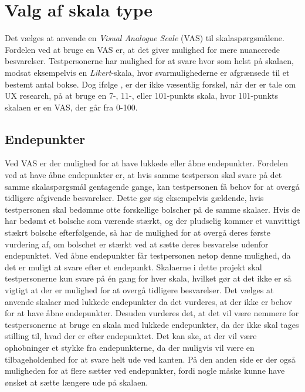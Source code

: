\section{Valg af skala type}
\label{ParametreSkalaType}
%
Det vælges at anvende en \textit{Visual Analogue Scale} (VAS) til skalaspørgsmålene. Fordelen ved at bruge en VAS er, at det giver mulighed for mere nuancerede besvarelser. Testpersonerne har mulighed for at svare hvor som helst på skalaen, modsat eksempelvis en \textit{Likert}-skala, hvor svarmulighederne er afgrænsede til et bestemt antal bokse.
Dog ifølge \textcite[s. 73]{PDF:RatingScales}, er der ikke væsentlig forskel, når der er tale om UX research, på at bruge en 7-, 11-, eller 101-punkts skala, hvor 101-punkts skalaen er en VAS, der går fra 0-100.
%
\subsection{Endepunkter}
Ved VAS er der mulighed for at have lukkede eller åbne endepunkter. Fordelen ved at have åbne endepunkter er, at hvis samme testperson skal svare på det samme skalaspørgsmål gentagende gange, kan testpersonen få behov for at overgå tidligere afgivende besvarelser. Dette gør sig eksempelvis gældende, hvis testpersonen skal bedømme otte forskellige bolscher på de samme skalaer. Hvis de har bedømt et bolsche som værende stærkt, og der pludselig kommer et vanvittigt stækrt bolsche efterfølgende, så har de mulighed for at overgå deres første vurdering af, om bolschet er stærkt ved at sætte deres besvarelse udenfor endepunktet. Ved åbne endepunkter får testpersonen netop denne mulighed, da det er muligt at svare efter et endepunkt. Skalaerne i dette projekt skal testpersonerne kun svare på én gang for hver skala, hvilket gør at det ikke er så vigtigt at der er mulighed for at overgå tidligere besvarelser. \blankline
%
Det vælges at anvende skalaer med lukkede endepunkter da det vurderes, at der ikke er behov for at have åbne endepunkter. Desuden vurderes det, at det vil være nemmere for testpersonerne at bruge en skala med lukkede endepunkter, da der ikke skal tages stilling til, hvad der er efter endepunktet. Det kan ske, at der vil være ophobninger et stykke fra endepunkterne, da der muligvis vil være en tilbageholdenhed for at svare helt ude ved kanten. På den anden side er der også muligheden for at flere sætter ved endepunkter, fordi nogle måske kunne have ønsket at sætte længere ude på skalaen. 
%
%
